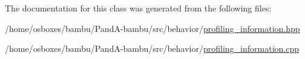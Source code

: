 The documentation for this class was generated from the following files\+:\begin{DoxyCompactItemize}
\item 
/home/osboxes/bambu/\+Pand\+A-\/bambu/src/behavior/\hyperlink{profiling__information_8hpp}{profiling\+\_\+information.\+hpp}\item 
/home/osboxes/bambu/\+Pand\+A-\/bambu/src/behavior/\hyperlink{profiling__information_8cpp}{profiling\+\_\+information.\+cpp}\end{DoxyCompactItemize}
